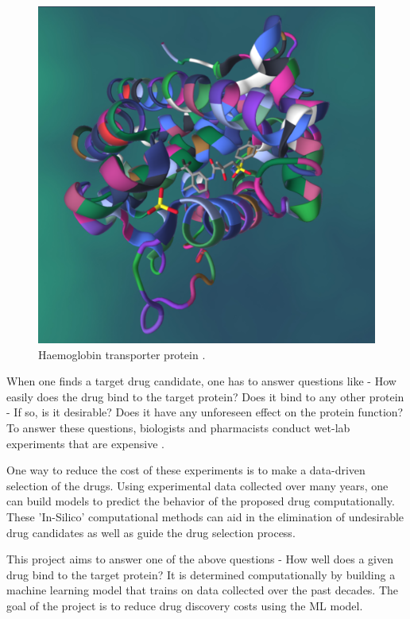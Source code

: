 \documentclass[11pt]{article}
\begin{document}
\begin{figure}[htb]
  \centering
    \includegraphics[scale=0.15]{images/pl_complex}
    \caption{Haemoglobin transporter protein \cite{PL_complex_introduction}.}
    \label{fig:HaemoglobinTransporterImage}
\end{figure}


When one finds a target drug candidate,  one has to answer questions like - How easily does the drug bind to the target protein? Does it bind to any other protein - If so, is it desirable? Does it have any unforeseen effect on the protein function?  To answer these questions, biologists and pharmacists conduct wet-lab experiments that are expensive \cite{drugdiscoverycost}.

One way to reduce the cost of these experiments is to make a data-driven selection of the drugs.  Using experimental data collected over many years, one can build models to predict the behavior of the proposed drug computationally.  These 'In-Silico' computational methods can aid in the elimination of undesirable drug candidates as well as guide the drug selection process.

This project aims to answer one of the above questions - How well does a given drug bind to the target protein? It is determined computationally by building a machine learning model that trains on data collected over the past decades. The goal of the project is to reduce drug discovery costs using the ML model. 
\end{document}
